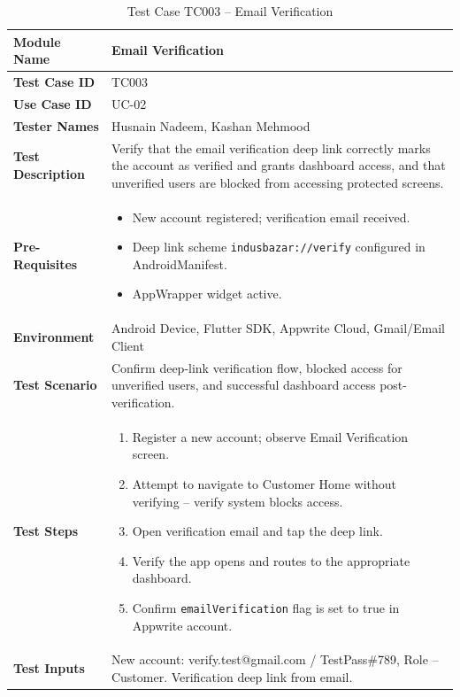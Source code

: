 \begin{table}[H]
\centering
\caption{Test Case TC003 -- Email Verification}
\label{tab:tc003}
\renewcommand{\arraystretch}{1.15}
\small
\begin{tabular}{|p{3.2cm}|p{10.8cm}|}
\hline
\textbf{Module Name} & Email Verification \\ \hline
\textbf{Test Case ID} & TC003 \\ \hline
\textbf{Use Case ID} & UC-02 \\ \hline
\textbf{Tester Names} & Husnain Nadeem, Kashan Mehmood \\ \hline
\textbf{Test Description} & Verify that the email verification deep link correctly marks the account as verified and grants dashboard access, and that unverified users are blocked from accessing protected screens. \\ \hline
\textbf{Pre-Requisites} &
\begin{itemize}[leftmargin=*,noitemsep]
\item New account registered; verification email received.
\item Deep link scheme \texttt{indusbazar://verify} configured in AndroidManifest.
\item AppWrapper widget active.
\end{itemize} \\ \hline
\textbf{Environment} & Android Device, Flutter SDK, Appwrite Cloud, Gmail/Email Client \\ \hline
\textbf{Test Scenario} & Confirm deep-link verification flow, blocked access for unverified users, and successful dashboard access post-verification. \\ \hline
\textbf{Test Steps} &
\begin{enumerate}[leftmargin=*,noitemsep]
\item Register a new account; observe Email Verification screen.
\item Attempt to navigate to Customer Home without verifying -- verify system blocks access.
\item Open verification email and tap the deep link.
\item Verify the app opens and routes to the appropriate dashboard.
\item Confirm \texttt{emailVerification} flag is set to true in Appwrite account.
\end{enumerate} \\ \hline
\textbf{Test Inputs} & New account: verify.test@gmail.com / TestPass\#789, Role -- Customer. Verification deep link from email. \\ \hline

\end{tabular}
\end{table}

